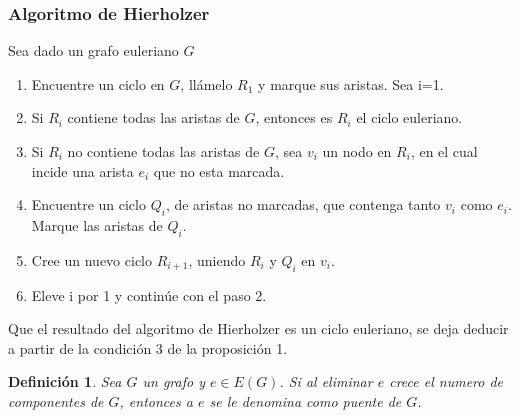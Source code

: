 \documentclass[12pt]{article}
\newtheorem{definition}{Definición}
\begin{document}
\subsubsection{Algoritmo de Hierholzer}
Sea dado un grafo euleriano $G$
\begin{enumerate}
\item Encuentre un ciclo en $G$, ll\'{a}melo $R_{1}$ y marque sus aristas. Sea i=1.
\item Si $R_{i}$ contiene todas las aristas de $G$, entonces es $R_{i}$ el ciclo euleriano.
\item Si $R_{i}$ no contiene todas las aristas de $G$, sea $v_{i}$ un nodo en $R_{i}$, en el cual incide una arista $e_{i}$ que no esta marcada.
\item Encuentre un ciclo $Q_{i}$, de aristas no marcadas, que contenga tanto $v_{i}$ como $e_{i}$. Marque las aristas de $Q_{i}$.
\item Cree un nuevo ciclo $R_{i+1}$, uniendo $R_{i}$ y $Q_{i}$ en $v_{i}$.
\item Eleve i por 1 y continúe con el paso 2.
\end{enumerate}
Que el resultado del algoritmo de Hierholzer es un ciclo euleriano, se deja deducir a partir de la condición 3 de la proposición 1.
\begin{definition}
Sea $G$ un grafo y $e \in E(G)$. Si al eliminar $e$ crece el numero de componentes de $G$, entonces a $e$ se le denomina como puente de $G$.
\end{definition}
\end{document}

